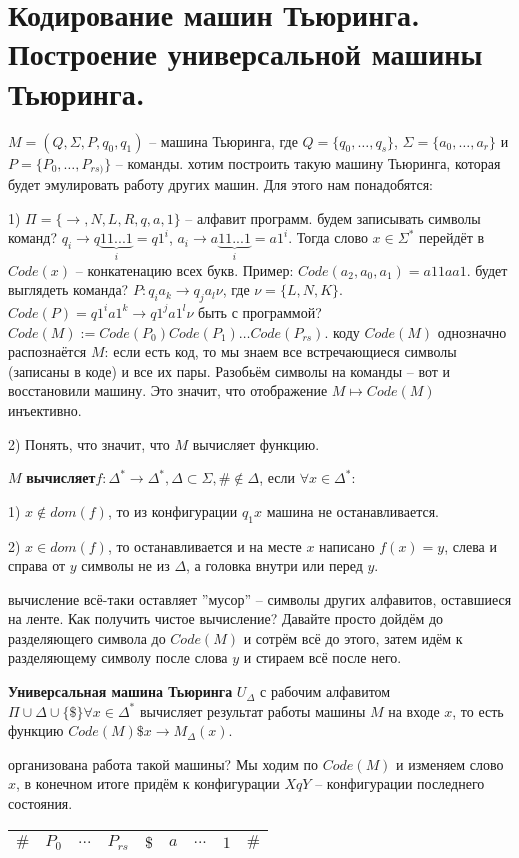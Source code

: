 \section{Кодирование машин Тьюринга. Построение универсальной машины Тьюринга.}
 $M=(Q, \Sigma, P, q_{0}, q_{1})$ -- машина Тьюринга, где $Q = \{q_{0}, \dots, q_{s}\}$, $\Sigma =
\{a_{0}, \dots, a_{r}\}$ и $P = \{P_{0}, \dots,  P_{rs)}\}$ -- команды. 
 хотим построить такую машину Тьюринга, которая будет эмулировать работу других машин. Для этого нам понадобятся:
\par1) $\Pi = \{\rightarrow, N, L, R, q, a, 1\}$ -- алфавит программ.
 будем записывать символы команд? $q_{i} \rightarrow q\underbrace{11...1}_{i} = q1^i$, $a_{i} \rightarrow
a\underbrace{11...1}_{i} = a1^i$. Тогда слово $x \in \Sigma^*$ перейдёт в $Code(x)$ -- конкатенацию всех букв.
Пример: $Code(a_{2}, a_{0}, a_{1}) = a11aa1$.
 будет выглядеть команда? $ P: q_{i}a_{k} \rightarrow q_{j}a_{l}\nu$, где $\nu = \{L, N, K \}$. $Code(P) =
q1^i a1^k \rightarrow q1^j a1^l \nu$
 быть с программой? $Code(M) := Code(P_{0})Code(P_{1}) \dots Code(P_{rs})$.
 коду $Code(M)$ однозначно распознаётся $M$: если есть код, то мы знаем все встречающиеся символы (записаны в
коде) и все их пары. Разобьём символы на команды -- вот и восстановили машину. Это значит, что отображение $M
\mapsto Code(M)$ инъективно.
\par2) Понять, что значит, что $M$ вычисляет функцию.
\par\begin{definition}$M$ \textbf{вычисляет}$f : \Delta^* \rightarrow \Delta^*, \Delta \subset \Sigma, \# \notin
	\Delta$, если $\forall x \in \Delta^*$:
	\par1) $x \notin dom(f)$, то из конфигурации $q_{1}x$ машина не останавливается.
	\par2) $x \in dom(f)$, то останавливается и на месте $x$ написано $f(x) = y$, слева и справа от $y$ символы не
	из $\Delta$, а головка внутри или перед $y$.
\end{definition}
 вычисление всё-таки оставляет ''мусор'' -- символы других алфавитов, оставшиеся на ленте. Как получить
чистое вычисление? Давайте просто дойдём до разделяющего символа до $Code(M)$ и сотрём всё до этого, затем идём к
разделяющему символу после слова $y$ и стираем всё после него.
\par\begin{definition}\textbf{Универсальная машина Тьюринга} $U_{\Delta}$ с рабочим алфавитом
	$\Pi\cup\Delta\cup\{\$\} \forall x \in \Delta^*$ вычисляет результат работы машины $M$ на входе $x$, то есть
	функцию $Code(M)\$x \rightarrow M_{\Delta}(x)$.
\end{definition}
 организована работа такой машины? Мы ходим по $Code(M)$ и изменяем слово $x$, в конечном итоге придём к
конфигурации $XqY$ -- конфигурации последнего состояния. 
\par
\begin{tabular}{ c|c|c|c|c|c|c|c|c } 
	\hline
	$\#$ & $P_{0}$ & $...$  & $P_{rs}$ & $\$$ & $a$ & $...$ & $1$ & $\#$ \\  \hline
\end{tabular}
